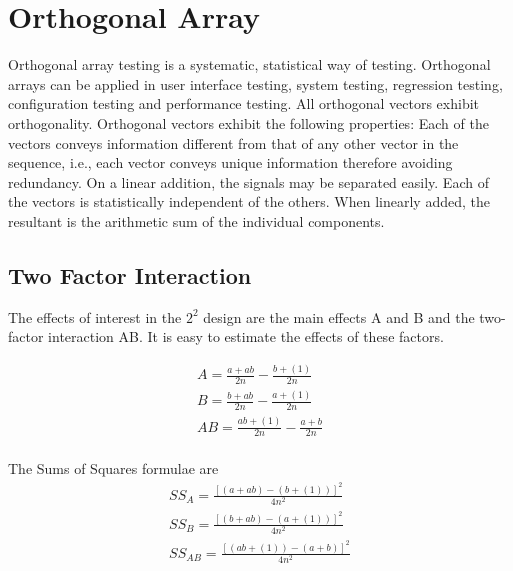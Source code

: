 \section{Orthogonal Array}
Orthogonal array testing is a systematic, statistical way of testing. Orthogonal arrays can be applied in user interface testing, system testing, regression testing, configuration testing and performance testing.
All orthogonal vectors exhibit orthogonality. Orthogonal vectors exhibit the following properties:
Each of the vectors conveys information different from that of any other vector in the sequence, i.e., each vector conveys unique information therefore avoiding redundancy.
On a linear addition, the signals may be separated easily.
Each of the vectors is statistically independent of the others.
When linearly added, the resultant is the arithmetic sum of the individual components.


\subsection{Two Factor Interaction}
The effects of interest in the $2^2$ design are the  main effects A and B and the two-factor interaction AB. It is easy to estimate the effects of these factors.

\begin{eqnarray}
A = \frac{a+ab}{2n} -  \frac{b + (1)}{2n}\\
B = \frac{b+ab}{2n} -  \frac{a + (1)}{2n}\\
AB = \frac{ab + (1)}{2n} -  \frac{a + b}{2n}\\
\end{eqnarray}

The Sums of Squares formulae are
\begin{eqnarray}
SS_{A} = \frac{[(a + ab)-(b + (1))]^2}{4n^2}\\
SS_{B} = \frac{[(b + ab)-(a + (1))]^2}{4n^2}\\
SS_{AB} = \frac{[(ab + (1))-(a + b)]^2}{4n^2}\\
\end{eqnarray}


